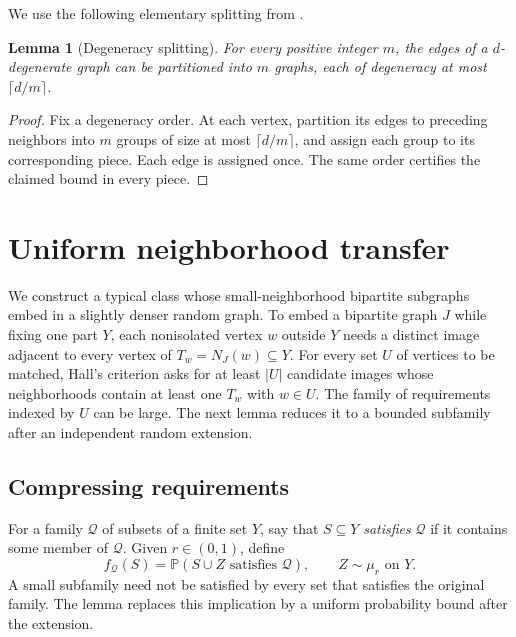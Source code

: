 \documentclass[11pt]{article}
\newtheorem{lemma}[theorem]{Lemma}
\theoremstyle{remark}
\numberwithin{equation}{section}
\newcommand{\Prob}{\mathbb P}
\newcommand{\calQ}{\mathcal Q}
\begin{document}
We use the following elementary splitting from
\cite[Claim~3.9]{AHPT26}.

\begin{lemma}[Degeneracy splitting]\label{lem:split}
For every positive integer $m$, the edges of a $d$-degenerate
graph can be partitioned into $m$ graphs, each of degeneracy
at most $\lceil d/m\rceil$.
\end{lemma}
\begin{proof}
Fix a degeneracy order. At each vertex, partition its edges to
preceding neighbors into $m$ groups of size at most
$\lceil d/m\rceil$, and assign each group to its corresponding
piece. Each edge is assigned once. The same order certifies the
claimed bound in every piece.
\end{proof}

\section{Uniform neighborhood transfer}
\label{sec:transfer}

We construct a typical class whose small-neighborhood bipartite
subgraphs embed in a slightly denser random graph. To embed a
bipartite graph $J$ while fixing one part $Y$, each nonisolated
vertex $w$ outside $Y$ needs a distinct image adjacent to every
vertex of $T_w=N_J(w)\subseteq Y$. For every set $U$ of vertices
to be matched, Hall's criterion asks for at least $|U|$ candidate
images whose neighborhoods contain at least one $T_w$ with $w\in U$.
The family of requirements indexed by $U$ can be large. The next
lemma reduces it to a bounded subfamily after an independent
random extension.

\subsection{Compressing requirements}

For a family $\calQ$ of subsets of a finite set $Y$, say that
$S\subseteq Y$ \emph{satisfies} $\calQ$ if it contains some
member of $\calQ$. Given $r\in(0,1)$, define
\begin{equation}\label{eq:smoothed-test}
 f_{\calQ}(S)=\Prob(S\cup Z\text{ satisfies }\calQ),
 \qquad Z\sim\mu_r\text{ on }Y.
\end{equation}
A small subfamily need not be satisfied by every set that
satisfies the original family. The lemma replaces this implication
by a uniform probability bound after the extension.
\end{document}
